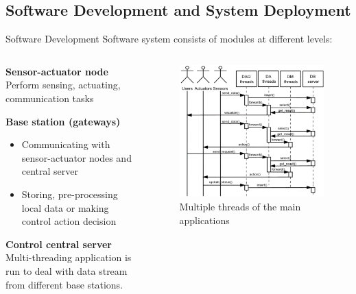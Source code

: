 \documentclass[aspectratio=169]{beamer}
\begin{document}
\subsection{Software Development and System Deployment}
\begin{frame}{Software Development}
    Software system consists of modules at different levels:
    \begin{columns}
        \begin{small}
            \begin{block}{\textbf{Sensor-actuator node}}
                Perform sensing, actuating, communication tasks
            \end{block}
            \begin{block}{\textbf{Base station (gateways)}}
                \begin{itemize}[label=$\circ$]
                    \item Communicating with sensor-actuator nodes and central server
                    \item Storing, pre-processing local data or making control action decision
                \end{itemize}
            \end{block}
            \begin{block}{\textbf{Control central server}}
                Multi-threading application is run to deal with data stream from different base stations.
            \end{block}
        \end{small}

        \begin{figure}
            \includegraphics[scale=0.2]{pic/multi_thread.png}
            \caption{\footnotesize{Multiple threads of the main applications}}
        \end{figure}
    \end{columns}
\end{frame}
\end{document}
